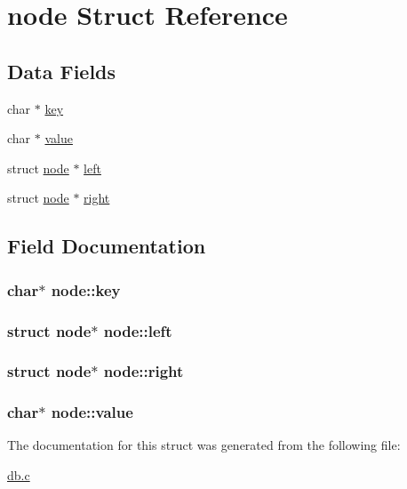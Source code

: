 \hypertarget{structnode}{\section{node Struct Reference}
\label{structnode}
}
\subsection*{Data Fields}
\begin{DoxyCompactItemize}
\item 
char $\ast$ \hyperlink{structnode_a69c02a14f8fdbc19c86fcd22854a4bda}{key}
\item 
char $\ast$ \hyperlink{structnode_a0d2c1eb2a9662a891bb09807232d7f9f}{value}
\item 
struct \hyperlink{structnode}{node} $\ast$ \hyperlink{structnode_a3ce38490a651bfda86d88ff955e96abc}{left}
\item 
struct \hyperlink{structnode}{node} $\ast$ \hyperlink{structnode_a875f75abfe22103500535b179828e4e3}{right}
\end{DoxyCompactItemize}


\subsection{Field Documentation}
\hypertarget{structnode_a69c02a14f8fdbc19c86fcd22854a4bda}{
\subsubsection[{key}]{\setlength{\rightskip}{0pt plus 5cm}char$\ast$ node\+::key}}\label{structnode_a69c02a14f8fdbc19c86fcd22854a4bda}
\hypertarget{structnode_a3ce38490a651bfda86d88ff955e96abc}{
\subsubsection[{left}]{\setlength{\rightskip}{0pt plus 5cm}struct {\bf node}$\ast$ node\+::left}}\label{structnode_a3ce38490a651bfda86d88ff955e96abc}
\hypertarget{structnode_a875f75abfe22103500535b179828e4e3}{
\subsubsection[{right}]{\setlength{\rightskip}{0pt plus 5cm}struct {\bf node}$\ast$ node\+::right}}\label{structnode_a875f75abfe22103500535b179828e4e3}
\hypertarget{structnode_a0d2c1eb2a9662a891bb09807232d7f9f}{
\subsubsection[{value}]{\setlength{\rightskip}{0pt plus 5cm}char$\ast$ node\+::value}}\label{structnode_a0d2c1eb2a9662a891bb09807232d7f9f}


The documentation for this struct was generated from the following file\+:\begin{DoxyCompactItemize}
\item 
\hyperlink{db_8c}{db.\+c}\end{DoxyCompactItemize}
